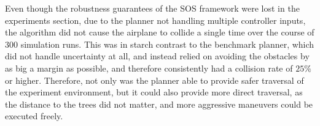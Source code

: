 Even though the robustness guarantees of the \ac{SOS} framework were lost in the
experiments section, due to the planner not handling multiple controller inputs,
the \rrtfunnel{} algorithm did not cause the airplane to collide a single time
over the course of \(300\) simulation runs. This was in starch contrast to the
benchmark planner, which did not handle uncertainty at all, and instead relied
on avoiding the obstacles by as big a margin as possible, and therefore
consistently had a collision rate of \(25\%\) or higher. Therefore, not only was
the \rrtfunnel{} planner able to provide safer traversal of the experiment
environment, but it could also provide more direct traversal, as the distance to
the trees did not matter, and more aggressive maneuvers could be executed
freely.


